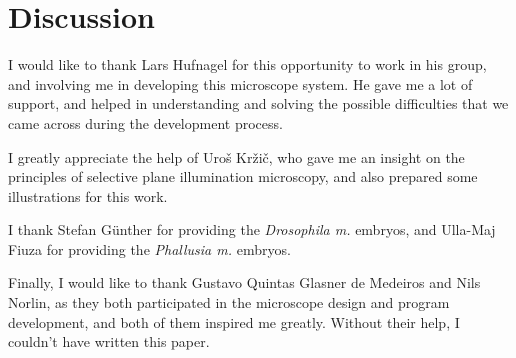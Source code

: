 \documentclass{diploma_style}
\begin{document}
\chapter{Discussion}



\newpage
\cleardoublepage
{}
\begin{acknowledgements}

I would like to thank Lars Hufnagel for this opportunity to work in his group, and involving me in developing this microscope system. He gave me a lot of support, and helped in understanding and solving the possible difficulties that we came across during the development process.

I greatly appreciate the help of Uroš Kržič, who gave me an insight on the principles of selective plane illumination microscopy, and also prepared some illustrations for this work.

I thank Stefan Günther for providing the \textit{Drosophila m.} embryos, and \mbox{Ulla-Maj} Fiuza for providing the \textit{Phallusia m.} embryos.

Finally, I would like to thank Gustavo Quintas Glasner de Medeiros and Nils Norlin, as they both participated in the microscope design and program development, and both of them inspired me greatly. Without their help, I couldn't have written this paper.

\end{acknowledgements}

\cleardoublepage
{}
{}

{ \footnotesize }
\end{document}
